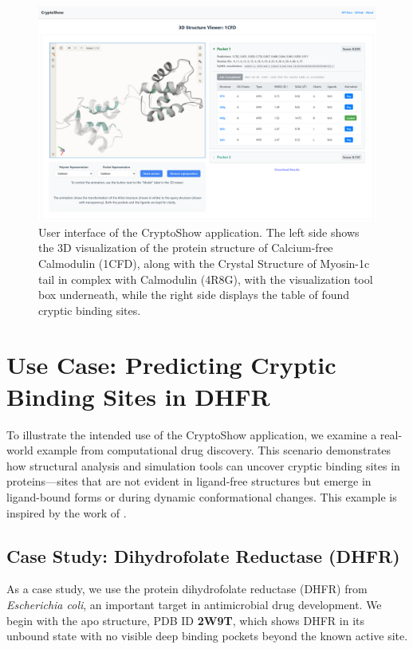 \begin{figure}[htbp]
    \centering
    \includegraphics[width=\textwidth]{img/ui.png}
    \caption{User interface of the CryptoShow application. The left side shows the 3D visualization of the protein structure of Calcium-free Calmodulin (1CFD), along with the Crystal Structure of Myosin-1c tail in complex with Calmodulin (4R8G), with the visualization tool box underneath, while the right side displays the table of found cryptic binding sites.}
    \label{fig:ui}
\end{figure}

\section{Use Case: Predicting Cryptic Binding Sites in DHFR}
\label{sec:use-case}

To illustrate the intended use of the CryptoShow application, we examine a real-world example from computational drug discovery. This scenario demonstrates how structural analysis and simulation tools can uncover cryptic binding sites in proteins—sites that are not evident in ligand-free structures but emerge in ligand-bound forms or during dynamic conformational changes. This example is inspired by the work of \citet{meller2023predicting}.

\subsection{Case Study: Dihydrofolate Reductase (DHFR)}
\label{subsec:dhfr-example}

As a case study, we use the protein dihydrofolate reductase (DHFR) from \textit{Escherichia coli}, an important target in antimicrobial drug development. We begin with the apo structure, PDB ID \textbf{2W9T}, which shows DHFR in its unbound state with no visible deep binding pockets beyond the known active site.

